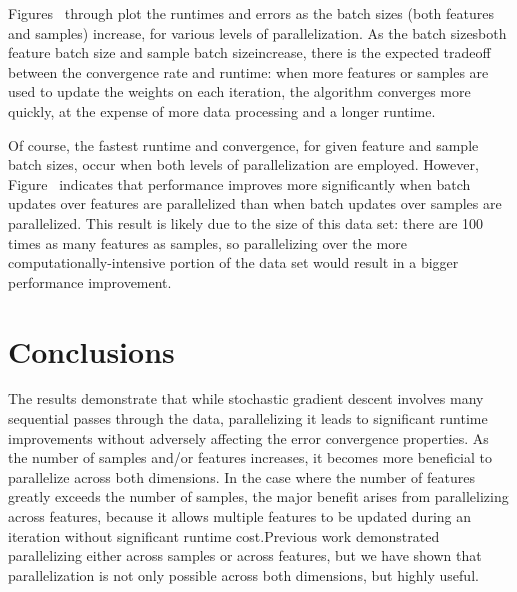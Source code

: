 \documentclass{article}
\begin{document}
Figures~\cite{fig:NAME1} through \cite{fig:NAMEn} plot the runtimes and errors as the batch sizes (both features and samples) increase, for various levels of parallelization. As the batch sizes\textemdash both feature batch size and sample batch size\textemdash increase, there is the expected tradeoff between the convergence rate and runtime: when more features or samples are used to update the weights on each iteration, the algorithm converges more quickly, at the expense of more data processing and a longer runtime.

Of course, the fastest runtime and convergence, for given feature and sample batch sizes, occur when both levels of parallelization are employed. However, Figure~\cite{fig:NAME} indicates that performance improves more significantly when batch updates over features are parallelized than when batch updates over samples are parallelized. This result is likely due to the size of this data set: there are 100 times as many features as samples, so parallelizing over the more computationally-intensive portion of the data set would result in a bigger performance improvement.

\section{Conclusions}
The results demonstrate that while stochastic gradient descent involves many sequential passes through the data, parallelizing it leads to significant runtime improvements without adversely affecting the error convergence properties.  As the number of samples and/or features increases, it becomes more beneficial to parallelize across both dimensions.  In the case where the number of features greatly exceeds the number of samples, the major benefit arises from parallelizing across features, because it allows multiple features to be updated during an iteration without significant runtime cost.Previous work demonstrated parallelizing either across samples or across features, but we have shown that parallelization is not only possible across both dimensions, but highly useful.



\end{document}
